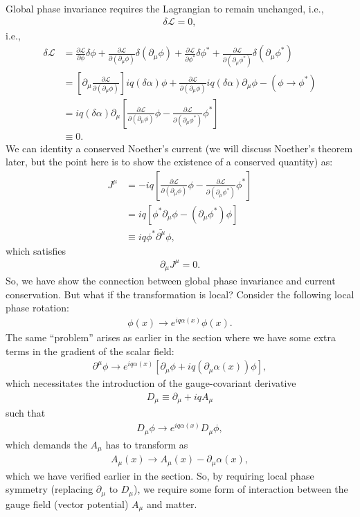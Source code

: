 \documentclass[a4paper,11pt]{article}
\numberwithin{equation}{section}
\theoremstyle{definition}
\newcommand{\p}{\partial}
\newcommand{\lag}{\mathcal{L}}
\begin{document}
Global phase invariance requires the Lagrangian to remain unchanged, i.e.,
\begin{align*}
\delta \lag = 0,
\end{align*}
i.e.,
\begin{align*}
\delta\lag &= \frac{\p \lag}{\p \phi}\delta \phi + \frac{\p \lag}{\p (\p_\mu\phi)}\delta (\p_\mu\phi) + \frac{\p \lag}{\p \phi^*}\delta \phi^* + \frac{\p \lag}{\p (\p_\mu\phi^*)}\delta (\p_\mu\phi^*)\\
&= \left[ \p_\mu \frac{\p \lag}{\p (\p_\mu\phi)}   \right]iq(\delta \alpha)\phi + \frac{\p\lag}{\p(\p_\mu\phi)}iq(\delta \alpha)\p_\mu\phi - (\phi\to \phi^*)\\
&= iq(\delta \alpha)\p_\mu \left[ \frac{\p\lag}{\p(\p_\mu \phi)}\phi - \frac{\p\lag}{\p(\p_\mu \phi^*)}\phi^* \right]\\ 
&\equiv 0. 
\end{align*}
We can identity a conserved Noether's current (we will discuss Noether's theorem later, but the point here is to show the existence of a conserved quantity) as:
\begin{align*}
J^\mu &= -iq\left[ \frac{\p\lag}{\p(\p_\mu \phi)}\phi - \frac{\p\lag}{\p(\p_\mu \phi^*)}\phi^* \right]\\
&= iq\left[\phi^*\p_\mu\phi - (\p_\mu\phi^*)\phi\right]\\
&\equiv iq\phi^*\bar{\p^\mu}\phi,
\end{align*}
which satisfies
\begin{align*}
\p_\mu J^\mu = 0.
\end{align*}
So, we have show the connection between global phase invariance and current conservation. But what if the transformation is local? Consider the following local phase rotation:
\begin{align*}
\phi(x) \to e^{iq\alpha(x)}\phi(x).
\end{align*}
The same ``problem'' arises as earlier in the section where we have some extra terms in the gradient of the scalar field:
\begin{align*}
\p^\mu \phi \to e^{iq\alpha(x)}\left[ \p_\mu\phi +  iq(\p_\mu \alpha(x))\phi \right],
\end{align*}
which necessitates the introduction of the gauge-covariant derivative
\begin{align*}
D_\mu \equiv \p_\mu + iq A_\mu
\end{align*}
such that
\begin{align*}
D_\mu\phi \to e^{iq\alpha(x)}D_\mu \phi,
\end{align*}
which demands the $A_\mu$ has to transform as
\begin{align*}
A_\mu(x) \to A_\mu(x) - \p_\mu \alpha(x),
\end{align*}
which we have verified earlier in the section. So, by requiring local phase symmetry (replacing $\p_\mu$ to $D_\mu$), we require some form of interaction between the gauge field (vector potential) $A_\mu$ and matter. 
\end{document}
